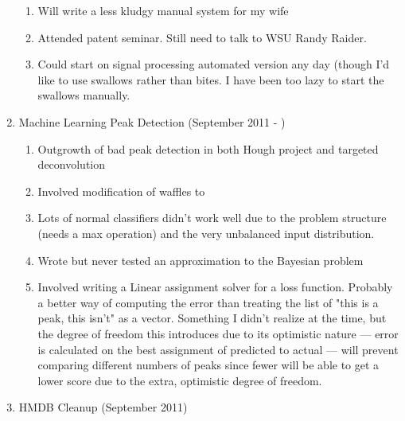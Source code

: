 \documentclass[english]{article}
\begin{document}
\begin{enumerate}
\begin{enumerate}
      \item Will write a less kludgy manual system for my wife
      \item Attended patent seminar. Still need to talk to WSU Randy Raider.
      \item Could start on signal processing automated version any day (though
            I'd like to use swallows rather than bites. I have been too lazy to
            start the swallows manually.
      \end{enumerate}
\item Machine Learning Peak Detection (September 2011 - )
      \begin{enumerate}
      \item Outgrowth of bad peak detection in both Hough project and
            targeted deconvolution
      \item Involved modification of waffles to 
      \item Lots of normal classifiers didn't work well due to the problem
            structure (needs a max operation) and the very unbalanced input
            distribution.
      \item Wrote but never tested an approximation to the Bayesian problem
      \item Involved writing a Linear assignment solver for a loss
            function. Probably a better way of computing the error than treating
            the list of "this is a peak, this isn't" as a vector. Something I
            didn't realize at the time, but the degree of freedom this introduces
            due to its optimistic nature --- error is calculated on the 
            best assignment of predicted to actual --- will prevent comparing
            different numbers of peaks since fewer will be able to get a lower
            score due to the extra, optimistic degree of freedom.
      \end{enumerate}
\item HMDB Cleanup (September 2011)
\end{enumerate}
\end{document}
